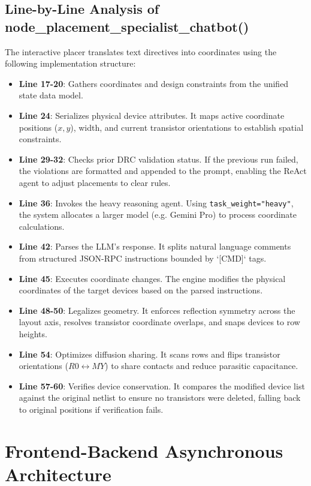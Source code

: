 \subsection{Line-by-Line Analysis of node\_placement\_specialist\_chatbot()}
The interactive placer translates text directives into coordinates using the following implementation structure:
\begin{itemize}
    \item \textbf{Line 17-20}: Gathers coordinates and design constraints from the unified state data model.
    \item \textbf{Line 24}: Serializes physical device attributes. It maps active coordinate positions ($x, y$), width, and current transistor orientations to establish spatial constraints.
    \item \textbf{Line 29-32}: Checks prior DRC validation status. If the previous run failed, the violations are formatted and appended to the prompt, enabling the ReAct agent to adjust placements to clear rules.
    \item \textbf{Line 36}: Invokes the heavy reasoning agent. Using \texttt{task\_weight="heavy"}, the system allocates a larger model (e.g. Gemini Pro) to process coordinate calculations.
    \item \textbf{Line 42}: Parses the LLM's response. It splits natural language comments from structured JSON-RPC instructions bounded by `[CMD]` tags.
    \item \textbf{Line 45}: Executes coordinate changes. The engine modifies the physical coordinates of the target devices based on the parsed instructions.
    \item \textbf{Line 48-50}: Legalizes geometry. It enforces reflection symmetry across the layout axis, resolves transistor coordinate overlaps, and snaps devices to row heights.
    \item \textbf{Line 54}: Optimizes diffusion sharing. It scans rows and flips transistor orientations ($R0 \leftrightarrow MY$) to share contacts and reduce parasitic capacitance.
    \item \textbf{Line 57-60}: Verifies device conservation. It compares the modified device list against the original netlist to ensure no transistors were deleted, falling back to original positions if verification fails.
\end{itemize}

\section[Asynchronous Architecture]{Frontend-Backend Asynchronous Architecture}
\label{sec:async_arch}

